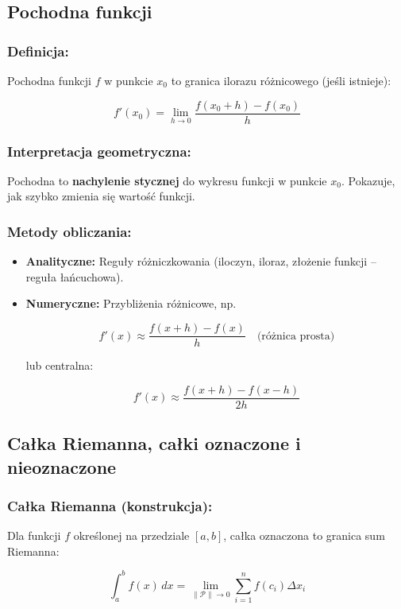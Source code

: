 \subsection{Pochodna funkcji}

\subsubsection*{Definicja:}
Pochodna funkcji $f$ w punkcie $x_0$ to granica ilorazu różnicowego (jeśli istnieje):

$$
f'(x_0) = \lim_{h \to 0} \frac{f(x_0 + h) - f(x_0)}{h}
$$

\subsubsection*{Interpretacja geometryczna:}
Pochodna to \textbf{nachylenie stycznej} do wykresu funkcji w punkcie $x_0$. Pokazuje, jak szybko zmienia się wartość funkcji.

\subsubsection*{Metody obliczania:}
\begin{itemize}
    \item \textbf{Analityczne:} Reguły różniczkowania (iloczyn, iloraz, złożenie funkcji -- reguła łańcuchowa).
    \item \textbf{Numeryczne:} Przybliżenia różnicowe, np.

  $$
  f'(x) \approx \frac{f(x+h) - f(x)}{h} \quad \text{(różnica prosta)}
  $$

  lub centralna:

  $$
  f'(x) \approx \frac{f(x+h) - f(x-h)}{2h}
  $$
\end{itemize}

\subsection{Całka Riemanna, całki oznaczone i nieoznaczone}

\subsubsection*{Całka Riemanna (konstrukcja):}
Dla funkcji $f$ określonej na przedziale $[a, b]$, całka oznaczona to granica sum Riemanna:

$$
\int_a^b f(x)\,dx = \lim_{\|\mathcal{P}\| \to 0} \sum_{i=1}^n f(c_i) \Delta x_i
$$

